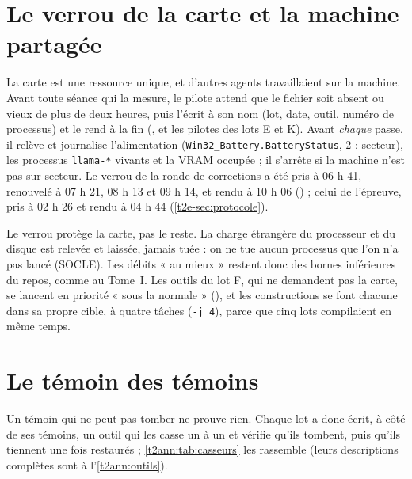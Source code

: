 \section{Le verrou de la carte et la machine partagée}\label{t2ann:sec:verrou}

La carte est une ressource unique, et d'autres agents travaillaient sur la machine. Avant toute séance qui la mesure, le pilote attend que le fichier  soit absent ou vieux de plus de deux heures, puis l'écrit à son nom (lot, date, outil, numéro de processus) et le rend à la fin (, et les pilotes des lots E et K). Avant \emph{chaque} passe, il relève et journalise l'alimentation (\texttt{Win32\_Battery.BatteryStatus}, 2 : secteur), les processus \texttt{llama-*} vivants et la VRAM occupée ; il s'arrête si la machine n'est pas sur secteur. Le verrou de la ronde de corrections a été pris à 06 h 41, renouvelé à 07 h 21, 08 h 13 et 09 h 14, et rendu à 10 h 06 () ; celui de l'épreuve, pris à 02 h 26 et rendu à 04 h 44 (\cref{t2e-sec:protocole}).

Le verrou protège la carte, pas le reste. La charge étrangère du processeur et du disque est relevée et laissée, jamais tuée : on ne tue aucun processus que l'on n'a pas lancé (SOCLE). Les débits « au mieux » restent donc des bornes inférieures du repos, comme au Tome~I. Les outils du lot F, qui ne demandent pas la carte, se lancent en priorité « sous la normale » (), et les constructions se font chacune dans sa propre cible, à quatre tâches (\texttt{-j 4}), parce que cinq lots compilaient en même temps.

\section{Le témoin des témoins}\label{t2ann:sec:temoins}

Un témoin qui ne peut pas tomber ne prouve rien. Chaque lot a donc écrit, à côté de ses témoins, un outil qui les casse un à un et vérifie qu'ils tombent, puis qu'ils tiennent une fois restaurés ; \cref{t2ann:tab:casseurs} les rassemble (leurs descriptions complètes sont à l'\cref{t2ann:outils}).

